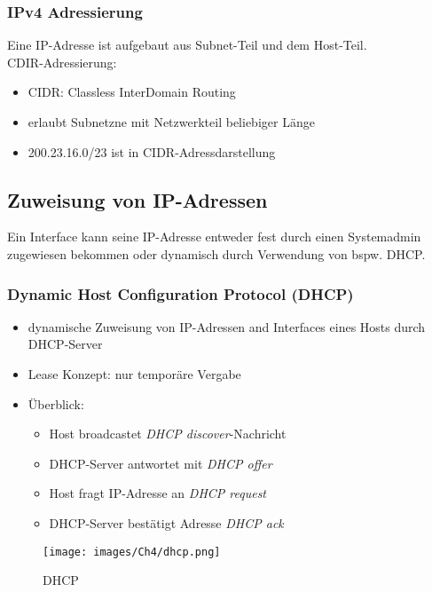 \subsubsection{IPv4 Adressierung}
Eine IP-Adresse ist aufgebaut aus Subnet-Teil und dem Host-Teil.\\
CDIR-Adressierung:
\begin{itemize}
    \item CIDR: Classless InterDomain Routing
    \item erlaubt Subnetzne mit Netzwerkteil beliebiger Länge
    \item 200.23.16.0/23 ist in CIDR-Adressdarstellung
\end{itemize}


\subsection{Zuweisung von IP-Adressen}
Ein Interface kann seine IP-Adresse entweder fest durch einen Systemadmin zugewiesen bekommen oder dynamisch durch Verwendung von bspw. DHCP.

\subsubsection{Dynamic Host Configuration Protocol (DHCP)}
\begin{itemize}
    \item dynamische Zuweisung von IP-Adressen and Interfaces eines Hosts durch DHCP-Server
    \item Lease Konzept: nur temporäre Vergabe
    \item Überblick:
            \begin{itemize}
                \item Host broadcastet \textit{DHCP discover}-Nachricht
                \item DHCP-Server antwortet mit \textit{DHCP offer}
                \item Host fragt IP-Adresse an \textit{DHCP request}
                \item DHCP-Server bestätigt Adresse \textit{DHCP ack}
            \end{itemize}
\end{itemize}

\begin{figure}[H]
    \centering
    \texttt{[image: images/Ch4/dhcp.png]}
    \caption{DHCP}
    \label{fig:dhcp}
\end{figure}

